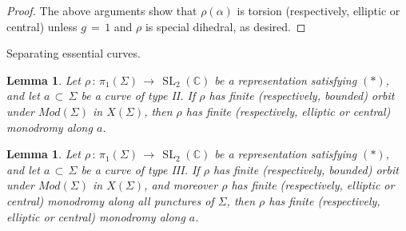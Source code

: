 \documentclass[reqno]{amsart}
\theoremstyle{plain}
\newtheorem{lemma}[theorem]{Lemma}
\theoremstyle{definition}
\theoremstyle{remark}
\newcommand{\C}{{\mathbb{C}}}
\DeclareMathOperator{\SL}{SL}
\begin{document}
\begin{proof}
The above arguments show that $\rho(\alpha)$ is torsion (respectively, elliptic or central) unless $g\,=\,1$ and 
$\rho$ is special dihedral, as desired.
\end{proof}

 Separating essential curves.

\begin{lemma}
\label{type2}
Let $\rho\,:\,\pi_1(\Sigma)\,\to\,\SL_2(\C)$ be a representation satisfying $(*)$, and let $a\,\subset\,
\Sigma$ be a curve of type II. If $\rho$ has finite (respectively, bounded) orbit under $Mod(\Sigma)$ in
$X(\Sigma)$, then $\rho$ has finite (respectively, elliptic or central) monodromy along $a$.
\end{lemma}

\begin{lemma}
\label{type3}
Let $\rho\,:\,\pi_1(\Sigma)\,\to\,\SL_2(\C)$ be a representation satisfying $(*)$, and let $a\,\subset\,
\Sigma$ be a curve of type III. If $\rho$ has finite (respectively, bounded) orbit  under $Mod(\Sigma)$
in $X(\Sigma)$, and moreover $\rho$ has finite (respectively, elliptic or central) monodromy along
all punctures of $\Sigma$, then $\rho$ has finite (respectively, elliptic or central) monodromy along $a$.
\end{lemma}
\end{document}

